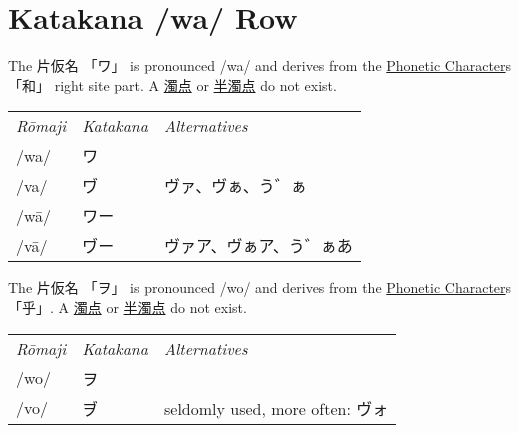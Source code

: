 \section{Katakana /wa/ Row}\label{sec:KatakanaWaRow}


\label{letter:wa} The 片仮名 {「ワ」} is pronounced  /wa/ and
derives from the \hyperref[sec:PhoneticCharacter]{Phonetic Character}s {「和」}
right site part.  A \hyperref[sec:Dakuten]{濁点}  or
\hyperref[sec:Handakuten]{半濁点} do not exist.


\begin{center}\begin{tabular}{lll}
\textit{Rōmaji}&\textit{Katakana}&\textit{Alternatives}\\
/wa/&ワ  &\\
/va/&ヷ  &\small ヴァ、ヴぁ、う゛ぁ\\
/wā/&ワー&\\
/vā/&ヷー&\small ヴァア、ヴぁア、う゛ぁあ\\
\end{tabular}\end{center}


\label{letter:wo} The 片仮名 {「ヲ」} is pronounced  /wo/ and
derives from the \hyperref[sec:PhoneticCharacter]{Phonetic Character}s
{「乎」}.  A \hyperref[sec:Dakuten]{濁点}  or \hyperref[sec:Handakuten]{半濁点}
do not exist.

\begin{center}\begin{tabular}{lll}
\textit{Rōmaji}&\textit{Katakana}&\textit{Alternatives}\\
/wo/&ヲ  &\\
/vo/&ヺ  &seldomly used, more often: ヴォ\\
\end{tabular}\end{center}


\newpage





